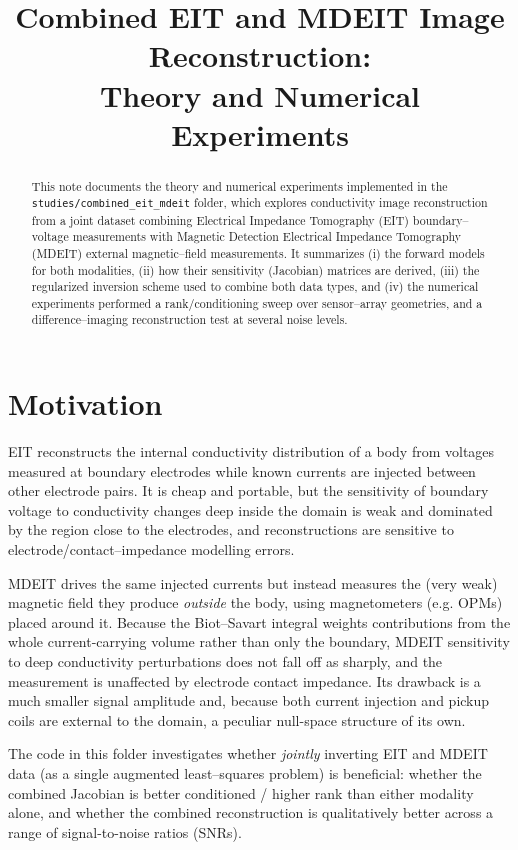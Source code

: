 \documentclass[11pt]{article}
\title{Combined EIT and MDEIT Image Reconstruction:\\ Theory and Numerical Experiments}
\author{}
\date{}
\begin{document}
\maketitle

\begin{abstract}
This note documents the theory and numerical experiments implemented in the \texttt{studies/combined\_eit\_mdeit} folder, which explores conductivity image reconstruction from a joint dataset combining Electrical Impedance Tomography (EIT) boundary--voltage measurements with Magnetic Detection Electrical Impedance Tomography (MDEIT) external magnetic--field measurements. It summarizes (i) the forward models for both modalities, (ii) how their sensitivity (Jacobian) matrices are derived, (iii) the regularized inversion scheme used to combine both data types, and (iv) the numerical experiments performed \textemdash{} a rank/conditioning sweep over sensor--array geometries, and a difference--imaging reconstruction test at several noise levels.
\end{abstract}

\tableofcontents

\section{Motivation}

EIT reconstructs the internal conductivity distribution of a body from voltages measured at boundary electrodes while known currents are injected between other electrode pairs. It is cheap and portable, but the sensitivity of boundary voltage to conductivity changes deep inside the domain is weak and dominated by the region close to the electrodes, and reconstructions are sensitive to electrode/contact--impedance modelling errors.

MDEIT drives the same injected currents but instead measures the (very weak) magnetic field they produce \emph{outside} the body, using magnetometers (e.g. OPMs) placed around it. Because the Biot--Savart integral weights contributions from the whole current-carrying volume rather than only the boundary, MDEIT sensitivity to deep conductivity perturbations does not fall off as sharply, and the measurement is unaffected by electrode contact impedance. Its drawback is a much smaller signal amplitude and, because both current injection and pickup coils are external to the domain, a peculiar null-space structure of its own.

The code in this folder investigates whether \emph{jointly} inverting EIT and MDEIT data (as a single augmented least--squares problem) is beneficial: whether the combined Jacobian is better conditioned / higher rank than either modality alone, and whether the combined reconstruction is qualitatively better across a range of signal-to-noise ratios (SNRs).
\end{document}
